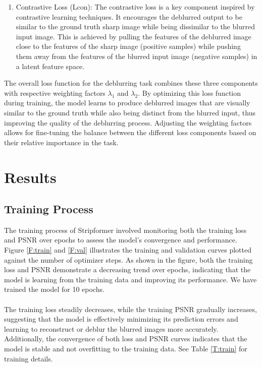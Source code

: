 \documentclass[12pt, a4paper, twoside]{article}
\begin{document}
\begin{itemize}
\begin{enumerate}
				\item Contrastive Loss (Lcon): The contrastive loss is a key component inspired by contrastive learning techniques. It encourages the deblurred output to be similar to the ground truth sharp image while being dissimilar to the blurred input image. This is achieved by pulling the features of the deblurred image close to the features of the sharp image (positive samples) while pushing them away from the features of the blurred input image (negative samples) in a latent feature space.
			\end{enumerate}
			
			The overall loss function for the deblurring task combines these three components with respective weighting factors $\lambda_1$ and $\lambda_2$. By optimizing this loss function during training, the model learns to produce deblurred images that are visually similar to the ground truth while also being distinct from the blurred input, thus improving the quality of the deblurring process. Adjusting the weighting factors allows for fine-tuning the balance between the different loss components based on their relative importance in the task.
		\end{itemize}
		
	\section{Results}
		\subsection{Training Process}
			The training process of Stripformer involved monitoring both the training loss and PSNR over epochs to assess the model's convergence and performance. Figure \ref{F:train} and \ref{F:val} illustrates the training and validation curves plotted against the number of optimizer steps. As shown in the figure, both the training loss and PSNR demonstrate a decreasing trend over epochs, indicating that the model is learning from the training data and improving its performance. We have trained the model for 10 epochs.
			\\
			\\
			The training loss steadily decreases, while the training PSNR gradually increases, suggesting that the model is effectively minimizing its prediction errors and learning to reconstruct or deblur the blurred images more accurately. Additionally, the convergence of both loss and PSNR curves indicates that the model is stable and not overfitting to the training data. See Table \ref{T:train} for training details.
			
\end{document}
